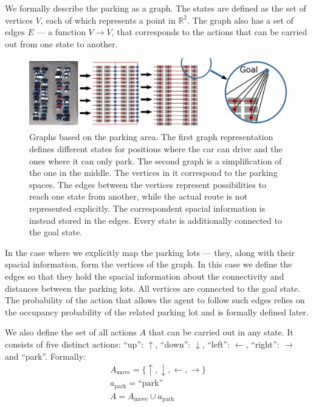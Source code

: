 We formally describe the parking as a graph. The states are defined as the set
of vertices $V$, each of which represents a point in $\mathbb{R}^2$. The graph
also has a set of edges $E$ --- a function $V \rightarrow V$, that corresponds
to the actions that can be carried out from one state to another.

\begin{figure}[t]
    \begin{center}
        \includegraphics[width=\textwidth]{pictures/graph.pdf}
    \end{center}
    \caption{Graphs based on the parking area. The first graph representation defines different states for positions where the car can drive and the ones where it can only park.
    The second graph is a simplification of the one in the middle. The vertices in it correspond to the parking spaces. The edges between the vertices represent possibilities to reach one state from another, while the actual route is not represented explicitly. The correspondent spacial information is instead stored in the edges. Every state is additionally connected to the goal state.}
    \vspace{-5mm}
    \label{fig:graph}
\end{figure}

In the case where we explicitly map the parking lots --- they, along with
their spacial information, form the vertices of the graph. In this case we
define the edges so that they hold the spacial information about the
connectivity and distances between the parking lots. All vertices are
connected to the goal state. The probability of the action that allows the
agent to follow such edges relies on the occupancy probability of the related
parking lot and is formally defined later.

We also define the set of all actions $A$ that can be carried out in any
state. It consists of five distinct actions: ``up'': $\uparrow$, ``down'':
$\downarrow$, ``left'': $\leftarrow$, ``right'': $\rightarrow$ and ``park''.
Formally:
\begin{eqnarray}
A_{\mathrm{move}} = \{ \uparrow, \downarrow, \leftarrow, \rightarrow \} \\
a_{\mathrm{park}} = \mbox{``park''} \\
A = A_{\mathrm{move}} \cup a_{\mathrm{park}}
\label{eq:actions}
\end{eqnarray}

